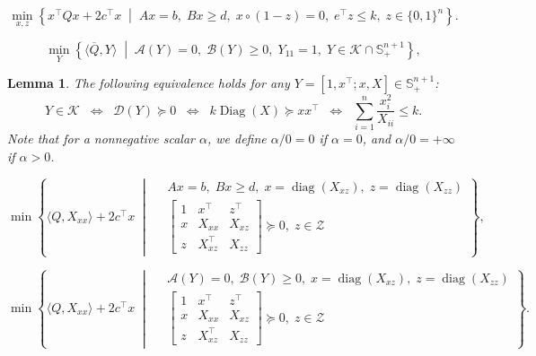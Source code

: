 \documentclass[10pt,a4paper]{amsart}
\newtheorem{lemma}{Lemma}
\def\A{\mathcal{A}}
\def\B{\mathcal{B}}
\def\D{\mathcal{D}}
\DeclareMathOperator{\Diag}{Diag}
\def\K{\mathcal{K}}
\def\S{\mathbb{S}}
\def\Z{\mathcal{Z}}
\def\bQ{\overline{Q}}
\DeclareMathOperator{\diag}{diag}
\begin{document}
\begin{equation}\label{eq:MIQP}
\min_{x,z}
\left\{
 x^\top Q x + 2c^\top x
\;\middle|\;
Ax=b,\; Bx\geq d,\;
x\circ (1-z)=0,\;
e^\top z\leq k,\;
z\in \{0,1\}^n
\right\}.
\end{equation}

\begin{equation}
\label{eq:intro-Decomposed-SDP}
\min_{Y}\left\{
\langle \bQ,Y \rangle  \;\middle|\;  
 \A(Y)=0,\; \B(Y)\geq 0,\; 
Y_{11}=1,\;
 Y\in \K\cap \S^{n+1}_+
\right\},\tag{Q}
\end{equation}

\begin{lemma}
\label{lemma:equivalence}
The following equivalence holds for any $Y=[1,x^\top; x, X]\in\S^{n+1}_+$:
\begin{equation}\label{eq:kDiag-xx-general}
   Y\in\K
   \;\; \Longleftrightarrow\;\;
    \D(Y)\succeq 0
\;\; \Longleftrightarrow\;\;
k\Diag(X)\succeq xx^\top 
\;\; \Longleftrightarrow\;\;
    \sum_{i=1}^n \frac{x_i^2}{X_{ii}}\leq k.
\end{equation}
Note that for a nonnegative scalar $\alpha$, we define 
$\alpha/0 = 0$ if $\alpha = 0$, and $\alpha/0 = +\infty$ if $\alpha > 0$.
\end{lemma}

\begin{equation}\label{eq:Shor}
\min\left\{
\langle Q,X_{xx} \rangle+2c^\top x  \;\middle|\;
\begin{aligned}
&Ax=b,\;Bx\geq d,\; x = \diag(X_{xz}),\; z = \diag(X_{zz})\\
& 
\begin{bmatrix}
    1&x^\top & z^\top\\
    x&X_{xx} & X_{xz}\\
    z&X_{xz}^\top & X_{zz}
\end{bmatrix}\succeq 0,\; z\in \Z
\end{aligned}
\right\},
\end{equation}

\begin{equation}\label{eq:Shor-RLT}
\min\left\{
\langle Q,X_{xx} \rangle+2c^\top x  \;\middle|\;
\begin{aligned}
&\A(Y)=0,\; \B(Y)\geq 0,\; x = \diag(X_{xz}),\; z = \diag(X_{zz})\\
& 
\begin{bmatrix}
    1&x^\top & z^\top\\
    x&X_{xx} & X_{xz}\\
    z&X_{xz}^\top & X_{zz}
\end{bmatrix}\succeq 0,\; z\in \Z
\end{aligned}
\right\}.
\end{equation}
\end{document}
